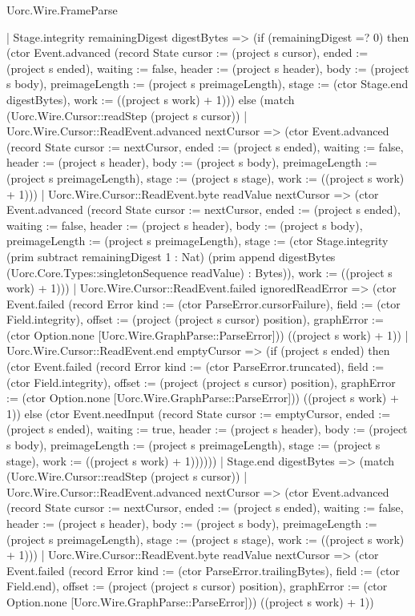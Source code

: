 \begin{lexlean}{Uorc.Wire.FrameParse}
\begin{semanticmodule}
{    | Stage.integrity remainingDigest digestBytes => (if (remainingDigest =? 0) then (ctor Event.advanced (record State {cursor := (project s cursor), ended := (project s ended), waiting := false, header := (project s header), body := (project s body), preimageLength := (project s preimageLength), stage := (ctor Stage.end digestBytes), work := ((project s work) + 1)})) else (match (Uorc.Wire.Cursor::readStep (project s cursor))
      | Uorc.Wire.Cursor::ReadEvent.advanced nextCursor => (ctor Event.advanced (record State {cursor := nextCursor, ended := (project s ended), waiting := false, header := (project s header), body := (project s body), preimageLength := (project s preimageLength), stage := (project s stage), work := ((project s work) + 1)}))
      | Uorc.Wire.Cursor::ReadEvent.byte readValue nextCursor => (ctor Event.advanced (record State {cursor := nextCursor, ended := (project s ended), waiting := false, header := (project s header), body := (project s body), preimageLength := (project s preimageLength), stage := (ctor Stage.integrity (prim subtract remainingDigest 1 : Nat) (prim append digestBytes (Uorc.Core.Types::singletonSequence readValue) : Bytes)), work := ((project s work) + 1)}))
      | Uorc.Wire.Cursor::ReadEvent.failed ignoredReadError => (ctor Event.failed (record Error {kind := (ctor ParseError.cursorFailure), field := (ctor Field.integrity), offset := (project (project s cursor) position), graphError := (ctor Option.none [Uorc.Wire.GraphParse::ParseError])}) ((project s work) + 1))
      | Uorc.Wire.Cursor::ReadEvent.end emptyCursor => (if (project s ended) then (ctor Event.failed (record Error {kind := (ctor ParseError.truncated), field := (ctor Field.integrity), offset := (project (project s cursor) position), graphError := (ctor Option.none [Uorc.Wire.GraphParse::ParseError])}) ((project s work) + 1)) else (ctor Event.needInput (record State {cursor := emptyCursor, ended := (project s ended), waiting := true, header := (project s header), body := (project s body), preimageLength := (project s preimageLength), stage := (project s stage), work := ((project s work) + 1)})))))
    | Stage.end digestBytes => (match (Uorc.Wire.Cursor::readStep (project s cursor))
      | Uorc.Wire.Cursor::ReadEvent.advanced nextCursor => (ctor Event.advanced (record State {cursor := nextCursor, ended := (project s ended), waiting := false, header := (project s header), body := (project s body), preimageLength := (project s preimageLength), stage := (project s stage), work := ((project s work) + 1)}))
      | Uorc.Wire.Cursor::ReadEvent.byte readValue nextCursor => (ctor Event.failed (record Error {kind := (ctor ParseError.trailingBytes), field := (ctor Field.end), offset := (project (project s cursor) position), graphError := (ctor Option.none [Uorc.Wire.GraphParse::ParseError])}) ((project s work) + 1))
}
\end{semanticmodule}
\end{lexlean}
